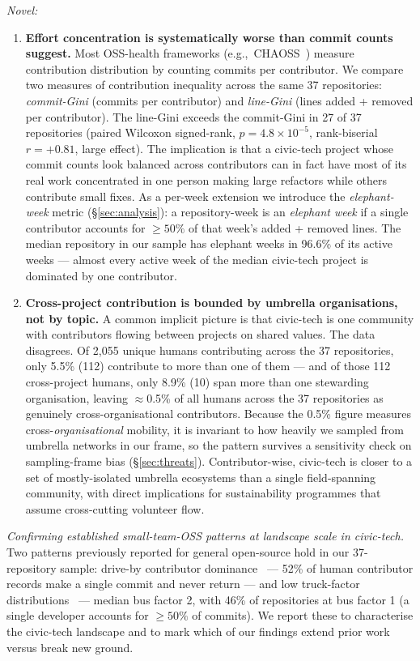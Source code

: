 \documentclass[a4paper,UKenglish,cleveref,autoref,thm-restate]{lipics-v2021}
\begin{document}
\emph{Novel:}
\begin{enumerate}[leftmargin=*]
\item \textbf{Effort concentration is systematically worse than commit counts suggest.} Most OSS-health frameworks (e.g.,~CHAOSS~\cite{Goggins2021}) measure contribution distribution by counting commits per contributor. We compare two measures of contribution inequality across the same 37 repositories: \emph{commit-Gini} (commits per contributor) and \emph{line-Gini} (lines added + removed per contributor). The line-Gini exceeds the commit-Gini in 27 of 37 repositories (paired Wilcoxon signed-rank, $p = 4.8 \times 10^{-5}$, rank-biserial $r = +0.81$, large effect). The implication is that a civic-tech project whose commit counts look balanced across contributors can in fact have most of its real work concentrated in one person making large refactors while others contribute small fixes. As a per-week extension we introduce the \emph{elephant-week} metric (\S\ref{sec:analysis}): a repository-week is an \emph{elephant week} if a single contributor accounts for $\geq 50\%$ of that week's added + removed lines. The median repository in our sample has elephant weeks in 96.6\% of its active weeks --- almost every active week of the median civic-tech project is dominated by one contributor.

\item \textbf{Cross-project contribution is bounded by umbrella organisations, not by topic.} A common implicit picture is that civic-tech is one community with contributors flowing between projects on shared values. The data disagrees. Of 2{,}055 unique humans contributing across the 37 repositories, only 5.5\% (112) contribute to more than one of them --- and of those 112 cross-project humans, only 8.9\% (10) span more than one stewarding organisation, leaving $\approx$0.5\% of all humans across the 37 repositories as genuinely cross-organisational contributors. Because the 0.5\% figure measures cross-\emph{organisational} mobility, it is invariant to how heavily we sampled from umbrella networks in our frame, so the pattern survives a sensitivity check on sampling-frame bias (\S\ref{sec:threats}). Contributor-wise, civic-tech is closer to a set of mostly-isolated umbrella ecosystems than a single field-spanning community, with direct implications for sustainability programmes that assume cross-cutting volunteer flow.
\end{enumerate}

\emph{Confirming established small-team-OSS patterns at landscape scale in civic-tech.} Two patterns previously reported for general open-source hold in our 37-repository sample: drive-by contributor dominance~\cite{Pinto2016} --- 52\% of human contributor records make a single commit and never return --- and low truck-factor distributions~\cite{Avelino2016} --- median bus factor 2, with 46\% of repositories at bus factor 1 (a single developer accounts for $\geq 50\%$ of commits). We report these to characterise the civic-tech landscape and to mark which of our findings extend prior work versus break new ground.
\end{document}
